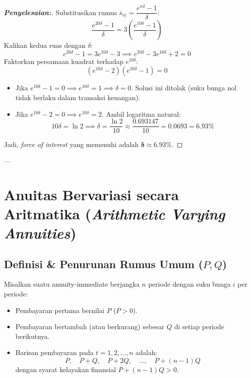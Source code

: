 \documentclass[11pt,a4paper]{article}
\begin{document}
\begin{proof}[\textbf{Penyelesaian:}]
Substitusikan rumus $\bar{s}_{\overline{n}|} = \dfrac{e^{n\delta} - 1}{\delta}$:
\begin{equation*}
    \frac{e^{20\delta} - 1}{\delta} = 3 \left( \frac{e^{10\delta} - 1}{\delta} \right)
\end{equation*}
Kalikan kedua ruas dengan $\delta$:
\begin{equation*}
    e^{20\delta} - 1 = 3 e^{10\delta} - 3 \implies e^{20\delta} - 3 e^{10\delta} + 2 = 0
\end{equation*}
Faktorkan persamaan kuadrat terhadap $e^{10\delta}$:
\begin{equation*}
    (e^{10\delta} - 2)(e^{10\delta} - 1) = 0
\end{equation*}
\begin{itemize}
    \item Jika $e^{10\delta} - 1 = 0 \implies e^{10\delta} = 1 \implies \delta = 0$. Solusi ini ditolak (suku bunga nol tidak berlaku dalam transaksi keuangan).
    \item Jika $e^{10\delta} - 2 = 0 \implies e^{10\delta} = 2$.
    Ambil logaritma natural:
    \begin{equation*}
        10\delta = \ln 2 \implies \delta = \frac{\ln 2}{10} \approx \frac{0.693147}{10} = \mathbf{0.0693} = \mathbf{6.93\%}
    \end{equation*}
\end{itemize}
Jadi, \textit{force of interest} yang memenuhi adalah $\mathbf{\delta \approx 6.93\%}$.
\end{proof}

---

\section{Anuitas Bervariasi secara Aritmatika (\textit{Arithmetic Varying Annuities})}

\subsection{Definisi \& Penurunan Rumus Umum (\texorpdfstring{$P, Q$}{P, Q})}

\begin{definitionbox}
Misalkan suatu annuity-immediate berjangka $n$ periode dengan suku bunga $i$ per periode:
\begin{itemize}
    \item Pembayaran pertama bernilai $P$ ($P > 0$).
    \item Pembayaran bertambah (atau berkurang) sebesar $Q$ di setiap periode berikutnya.
    \item Barisan pembayaran pada $t = 1, 2, \dots, n$ adalah:
    \begin{equation*}
        P, \quad P+Q, \quad P+2Q, \quad \dots, \quad P+(n-1)Q
    \end{equation*}
    dengan syarat kelayakan finansial $P + (n-1)Q > 0$.
\end{itemize}
\end{definitionbox}
\end{document}
